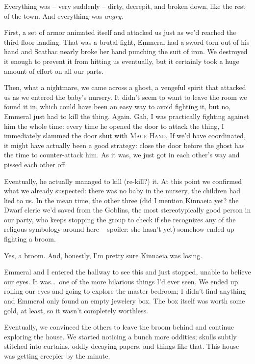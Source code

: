 Everything was -- very suddenly -- dirty, decrepit, and broken down, like the rest of the town. And everything was \emph{angry}.

First, a set of armor animated itself and attacked us just as we'd reached the third floor landing. That was a brutal fight, Emmeral had a sword torn out of his hand and Scathac nearly broke her hand punching the suit of iron. We destroyed it enough to prevent it from hitting us eventually, but it certainly took a huge amount of effort on all our parts.

Then, what a nightmare, we came across a ghost, a vengeful spirit that attacked us as we entered the baby's nursery. It didn't seem to want to leave the room we found it in, which could have been an easy way to avoid fighting it, but no, Emmeral just had to kill the thing. Again. Gah, I was practically fighting against him the whole time: every time he opened the door to attack the thing, I immediately slammed the door shut with \textsc{Mage Hand}. If we'd have coordinated, it might have actually been a good strategy: close the door before the ghost has the time to counter-attack him. As it was, we just got in each other's way and pissed each other off.

Eventually, he actually managed to kill (re-kill?) it. At this point we confirmed what we already suspected: there was no baby in the nursery, the children had lied to us. In the mean time, the other three (did I mention Kinnaeia yet? the Dwarf cleric we'd saved from the Goblins, the most stereotypically good person in our party, who keeps stopping the group to check if she recognizes any of the religous symbology around here -- spoiler: she hasn't yet) somehow ended up fighting a broom.

Yes, a broom. And, honestly, I'm pretty sure Kinnaeia was losing.

Emmeral and I entered the hallway to see this and just stopped, unable to believe our eyes. It was\dots\ one of the more hilarious things I'd ever seen. We ended up rolling our eyes and going to explore the master bedroom; I didn't find anything and Emmeral only found an empty jewelery box. The box itself was worth some gold, at least, so it wasn't completely worthless.

Eventually, we convinced the others to leave the broom behind and continue exploring the house. We started noticing a bunch more oddities; skulls subtly stitched into curtains, oddly decaying papers, and things like that. This house was getting creepier by the minute.

